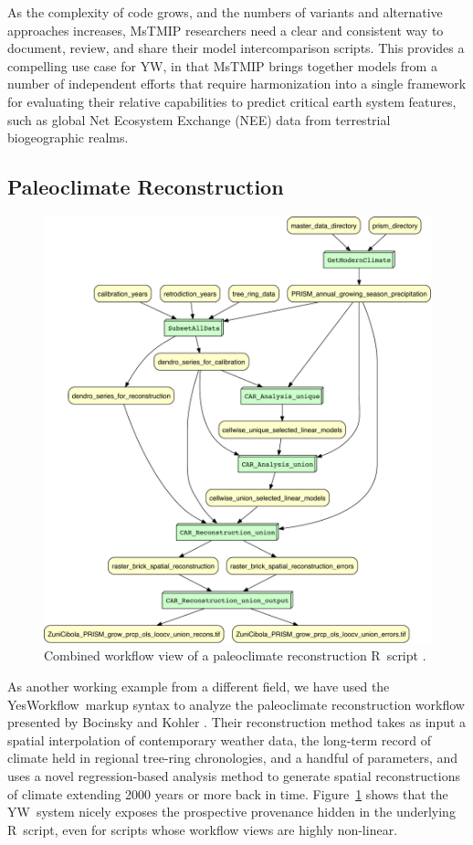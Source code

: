 \documentclass[15]{idcc}
\newcommand{\YW}{\textsf{YesWorkflow}}
\newcommand{\yw}{\textsf{YW}}
\newcommand{\R}{R}
\newcommand{\figref}[1]{Figure~\ref{#1}}
\begin{document}
As the complexity of code grows, and the numbers of variants and
alternative approaches increases, MsTMIP researchers need a clear and
consistent way to document, review, and share their model
intercomparison scripts. This provides a compelling use case for \yw,
in that MsTMIP brings together models from a number of independent
efforts that require harmonization into a single framework for
evaluating their relative capabilities to predict critical earth
system features, such as global Net Ecosystem Exchange (NEE) data from
terrestrial biogeographic realms.




 \subsection{Paleoclimate Reconstruction}

 \begin{figure}[t]
   \centering
   \includegraphics[width=.7\textwidth]{figures/SKOPE_combined-crop.pdf}
   \caption{Combined workflow view of a paleoclimate reconstruction
     \R\ script \protect\cite{bocinsky2014}.}
   \label{fig-skope}
 \end{figure}

 As another working example from a different field, we have used the
 \YW\ markup syntax to analyze the paleoclimate reconstruction
 workflow presented by Bocinsky and Kohler \cite{bocinsky2014}. Their
 reconstruction method takes as input a spatial interpolation of
 contemporary weather data, the long-term record of climate held in
 regional tree-ring chronologies, and a handful of parameters, and
 uses a novel regression-based analysis method to generate spatial
 reconstructions of climate extending 2000 years or more back in
 time. \figref{fig-skope} shows that the \yw\ system nicely exposes
 the prospective provenance hidden in the underlying \R\ script, even
 for scripts whose workflow views are highly non-linear.
\end{document}
